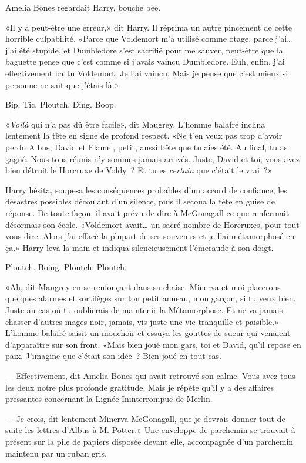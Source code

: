 Amelia Bones regardait Harry, bouche bée.

«Il y a peut-être une erreur,» dit Harry. Il réprima un autre pincement de cette horrible culpabilité. «Parce que Voldemort m'a utilisé comme otage, parce j'ai… j'ai été stupide, et Dumbledore s'est sacrifié pour me sauver, peut-être que la baguette pense que c'est comme si j'avais vaincu Dumbledore. Euh, enfin, j'ai effectivement battu Voldemort. Je l'ai vaincu. Mais je pense que c'est mieux si personne ne sait que j'étais là.»

Bip. Tic. Ploutch. Ding. Boop.

«\emph{Voilà} qui n'a pas dû être facile», dit Maugrey. L'homme balafré inclina lentement la tête en signe de profond respect. «Ne t'en veux pas trop d'avoir perdu Albus, David et Flamel, petit, aussi bête que tu aies été. Au final, tu as gagné. Nous tous réunis n'y sommes jamais arrivés. Juste, David et toi, vous avez bien détruit le Horcruxe de Voldy~? Et tu es \emph{certain} que c'était le vrai~?»

Harry hésita, soupesa les conséquences probables d'un accord de confiance, les désastres possibles découlant d'un silence, puis il secoua la tête en guise de réponse. De toute façon, il avait prévu de dire à McGonagall ce que renfermait désormais son école. «Voldemort avait… un sacré nombre de Horcruxes, pour tout vous dire. Alors j'ai effacé la plupart de ses souvenirs et je l'ai métamorphosé en ça.» Harry leva la main et indiqua silencieusement l'émeraude à son doigt.

Ploutch. Boing. Ploutch. Ploutch.

«Ah, dit Maugrey en se renfonçant dans sa chaise. Minerva et moi placerons quelques alarmes et sortilèges sur ton petit anneau, mon garçon, si tu veux bien. Juste au cas où tu oublierais de maintenir la Métamorphose. Et ne va jamais chasser d'autres mages noir, jamais, vis juste une vie tranquille et paisible.» L'homme balafré saisit un mouchoir et essuya les gouttes de sueur qui venaient d'apparaître sur son front. «Mais bien joué mon gars, toi et David, qu'il repose en paix. J'imagine que c'était son idée~? Bien joué en tout cas.

--- Effectivement, dit Amelia Bones qui avait retrouvé son calme. Vous avez tous les deux notre plus profonde gratitude. Mais je répète qu'il y a des affaires pressantes concernant la Lignée Ininterrompue de Merlin.

--- Je crois, dit lentement Minerva McGonagall, que je devrais donner tout de suite les lettres d'Albus à M. Potter.» Une enveloppe de parchemin se trouvait à présent sur la pile de papiers disposée devant elle, accompagnée d'un parchemin maintenu par un ruban gris.

